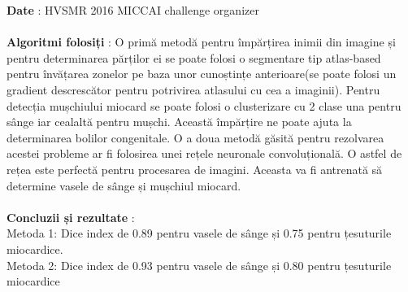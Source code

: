 \documentclass[a4papaer,12pt]{article}
\begin{document}
\indent \textbf{Date} : HVSMR 2016 MICCAI challenge organizer
\\\\
\indent \textbf{Algoritmi folosiți} : O primă metodă pentru împărțirea inimii din imagine și pentru determinarea părților ei se poate folosi o segmentare tip atlas-based pentru învățarea zonelor pe baza unor cunoștințe anterioare(se poate folosi un gradient descrescător pentru potrivirea atlasului cu cea a imaginii). Pentru detecția mușchiului miocard se poate folosi o clusterizare cu 2 clase una pentru sânge iar cealaltă pentru mușchi. Această împărțire ne poate ajuta la determinarea bolilor congenitale.
\indent O a doua metodă găsită pentru rezolvarea acestei probleme ar fi folosirea unei rețele neuronale convoluțională. O astfel de rețea este perfectă pentru procesarea de imagini. Aceasta va fi antrenată să determine vasele de sânge și mușchiul miocard.
\\\\
\indent \textbf{Concluzii și rezultate} :
\\ 
\indent Metoda 1: Dice index de 0.89 pentru vasele de sânge și 0.75 pentru țesuturile miocardice.
\\
\indent Metoda 2: Dice index de 0.93 pentru vasele de sânge și 0.80 pentru țesuturile miocardice
\end{document}
